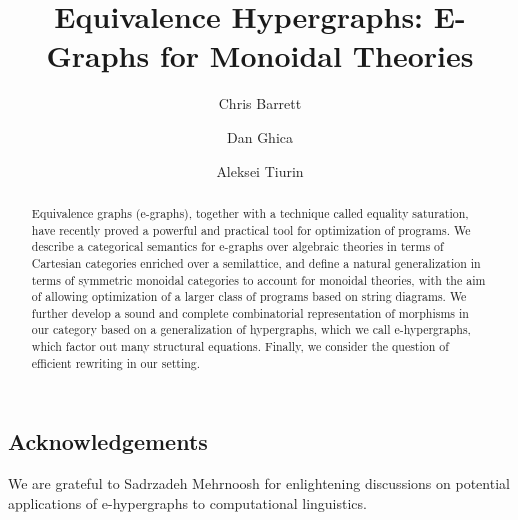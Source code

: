\documentclass
  [ acmsmall
  , pdftex
  , dvipsnames
  , review
  , nonacm
  , screen
  ]{acmart}
\title{Equivalence Hypergraphs: E-Graphs for Monoidal Theories }
\author{Chris Barrett}
\author{Dan Ghica}
\author{Aleksei Tiurin}
\begin{document}
\begin{abstract}
Equivalence graphs (e-graphs), together with a technique called equality saturation, have recently proved a powerful and practical tool for optimization of programs.  We describe a categorical semantics for e-graphs over algebraic theories in terms of Cartesian categories enriched over a semilattice,  and define a natural generalization in terms of symmetric monoidal categories to account for monoidal theories,  with the aim of allowing optimization of a larger class of programs based on string diagrams.  We further develop a sound and complete combinatorial representation of morphisms in our category based on a generalization of hypergraphs,  which we call e-hypergraphs,  which factor out many structural equations.  Finally, we consider the question of efficient rewriting in our setting.
\end{abstract}

\maketitle









\subsection*{Acknowledgements}
We are grateful to Sadrzadeh Mehrnoosh for enlightening discussions on potential applications of e-hypergraphs to computational linguistics. 



\end{document}
